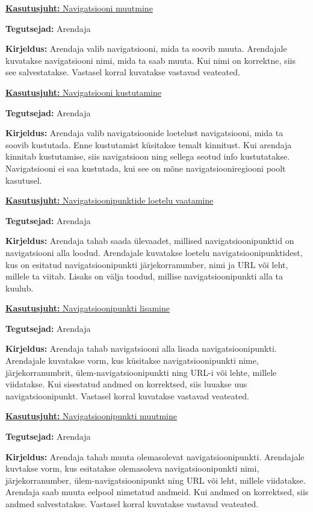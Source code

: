 \documentclass[a4paper,12pt]{article} %
\begin{document}
\underline{\textbf{Kasutusjuht:} Navigatsiooni muutmine}
\par
\textbf{Tegutsejad:} Arendaja
\par
\textbf{Kirjeldus:} Arendaja valib navigatsiooni, mida ta soovib muuta. Arendajale kuvatakse navigatsiooni nimi, mida ta saab muuta. Kui nimi on korrektne, siis see salvestatakse. Vastasel korral kuvatakse vastavad veateated.
\par
\pagebreak
\underline{\textbf{Kasutusjuht:} Navigatsiooni kustutamine}
\par
\textbf{Tegutsejad:} Arendaja
\par
\textbf{Kirjeldus:} Arendaja valib navigatsioonide loetelust navigatsiooni, mida ta soovib kustutada. Enne kustutamist küsitakse temalt kinnitust. Kui arendaja kinnitab kustutamise, siis navigatsioon ning sellega seotud info kustutatakse. Navigatsiooni ei saa kustutada, kui see on mõne navigatsiooniregiooni poolt kasutusel.
\par

\underline{\textbf{Kasutusjuht:} Navigatsioonipunktide loetelu vaatamine}
\par
\textbf{Tegutsejad:} Arendaja
\par
\textbf{Kirjeldus:} Arendaja tahab saada ülevaadet, millised navigatsioonipunktid on navigatsiooni alla loodud. Arendajale kuvatakse loetelu navigatsioonipunktidest, kus on esitatud navigatsioonipunkti järjekorranumber, nimi ja URL või leht, millele ta viitab. Lisaks on välja toodud, millise navigatsioonipunkti alla ta kuulub.
\par

\underline{\textbf{Kasutusjuht:} Navigatsioonipunkti lisamine}
\par
\textbf{Tegutsejad:} Arendaja
\par
\textbf{Kirjeldus:} Arendaja tahab navigatsiooni alla lisada navigatsioonipunkti. Arendajale kuvatakse vorm, kus küsitakse navigatsioonipunkti nime, järjekorranumbrit, ülem-navigatsioonipunkti ning URL-i või lehte, millele viidatakse. Kui sisestatud andmed on korrektsed, siis luuakse uus navigatsioonipunkt. Vastasel korral kuvatakse vastavad veateated.
\par

\underline{\textbf{Kasutusjuht:} Navigatsioonipunkti muutmine}
\par
\textbf{Tegutsejad:} Arendaja
\par
\textbf{Kirjeldus:} Arendaja tahab muuta olemasolevat navigatsioonipunkti. Arendajale kuvtakse vorm, kus esitatakse olemasoleva navigatsioonipunkti nimi, järjekorranumber, ülem-navigatsioonipunkt ning URL või leht, millele viidatakse. Arendaja saab muuta eelpool nimetatud andmeid. Kui andmed on korrektsed, siis andmed salvestatakse. Vastasel korral kuvatakse vastavad veateated.
\par
\end{document}
